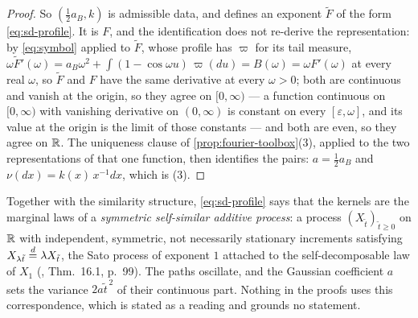\begin{proof}
So $(\tfrac12 a_B, k)$ is admissible data, and defines an exponent $\tilde F$ of the form
\ref{eq:sd-profile}. It is $F$, and the identification does not re-derive the representation:
by \ref{eq:symbol} applied to $\tilde F$, whose profile has $\varpi$ for its tail measure,
$\omega\tilde F'(\omega) = a_B\omega^2 + \int (1 - \cos\omega u)\,\varpi(du) = B(\omega)
 = \omega F'(\omega)$ at every real $\omega$, so $\tilde F$ and $F$ have the same derivative at
every $\omega > 0$; both are continuous and vanish at the origin, so they agree on $[0,\infty)$
--- a function continuous on $[0,\infty)$ with vanishing derivative on $(0,\infty)$ is constant
on every $[\varepsilon, \omega]$, and its value at the origin is the limit of those constants
--- and both are even, so they agree on $\mathbb{R}$. The uniqueness clause of
\ref{prop:fourier-toolbox}(3), applied to the two representations of that one function, then
identifies the pairs: $a = \tfrac12 a_B$ and $\nu(dx) = k(x)\,x^{-1}dx$, which is (3).
\end{proof}

\begin{remark}\label{rem:sato-process}
Together with the similarity structure, \ref{eq:sd-profile} says that the kernels are the
marginal laws of a \emph{symmetric self-similar additive process}: a process
$(X_{\tilde t})_{\tilde t \ge 0}$ on $\mathbb{R}$ with independent, symmetric, not necessarily
stationary increments satisfying $X_{\lambda\tilde t} \stackrel{d}{=} \lambda X_{\tilde t}$, the Sato
process of exponent $1$ attached to the self-decomposable law of $X_1$
(, Thm.~16.1, p.~99). The paths oscillate, and the Gaussian coefficient
$a$ sets the variance $2a\tilde t^{\,2}$ of their continuous part. Nothing in the proofs uses
this correspondence, which is stated as a reading and grounds no statement.
\end{remark}

